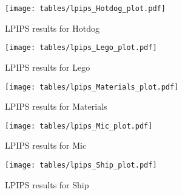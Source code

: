 \begin{figure}[h!]
\centering
\texttt{[image: tables/lpips\_Hotdog\_plot.pdf]}
\caption{LPIPS results for Hotdog}
\label{fig:ap_lpips_Hotdog_plot}
\end{figure}

\begin{figure}[h!]
\centering
\texttt{[image: tables/lpips\_Lego\_plot.pdf]}
\caption{LPIPS results for Lego}
\label{fig:ap_lpips_Lego_plot}
\end{figure}

\begin{figure}[h!]
\centering
\texttt{[image: tables/lpips\_Materials\_plot.pdf]}
\caption{LPIPS results for Materials}
\label{fig:ap_lpips_Materials_plot}
\end{figure}

\begin{figure}[h!]
\centering
\texttt{[image: tables/lpips\_Mic\_plot.pdf]}
\caption{LPIPS results for Mic}
\label{fig:ap_lpips_Mic_plot}
\end{figure}

\begin{figure}[h!]
\centering
\texttt{[image: tables/lpips\_Ship\_plot.pdf]}
\caption{LPIPS results for Ship}
\label{fig:ap_lpips_Ship_plot}
\end{figure}
